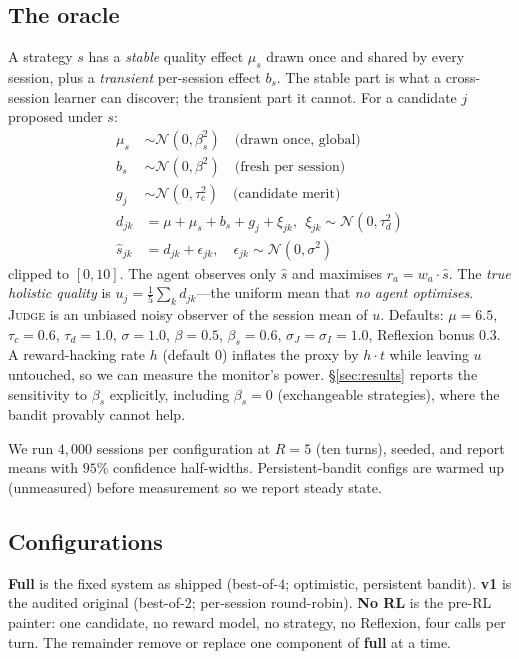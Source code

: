 \documentclass[11pt]{article}
\newcommand{\JUDGE}{\textsc{Judge}}
\theoremstyle{plain}
\theoremstyle{definition}
\begin{document}
\subsection{The oracle}
A strategy $s$ has a \emph{stable} quality effect $\mu_s$ drawn once and shared
by every session, plus a \emph{transient} per-session effect $b_s$. The stable
part is what a cross-session learner can discover; the transient part it cannot.
For a candidate $j$ proposed under $s$:
\begin{align}
\mu_s &\sim \mathcal{N}(0,\beta_{\!s}^2) \quad \text{(drawn once, global)}\nonumber\\
b_s &\sim \mathcal{N}(0,\beta^2) \quad \text{(fresh per session)}\nonumber\\
g_j &\sim \mathcal{N}(0,\tau_c^2) \quad \text{(candidate merit)}\nonumber\\
d_{jk} &= \mu + \mu_s + b_s + g_j + \xi_{jk},\ \ \xi_{jk}\sim\mathcal{N}(0,\tau_d^2)\\
\hat{s}_{jk} &= d_{jk} + \epsilon_{jk},\quad \epsilon_{jk}\sim\mathcal{N}(0,\sigma^2)\nonumber
\end{align}
clipped to $[0,10]$. The agent observes only $\hat{s}$ and maximises
$r_a = w_a \cdot \hat{s}$. The \emph{true holistic quality} is
$u_j = \frac{1}{5}\sum_k d_{jk}$---the uniform mean that \emph{no agent
optimises}. \JUDGE{} is an unbiased noisy observer of the session mean of $u$.
Defaults: $\mu{=}6.5$, $\tau_c{=}0.6$, $\tau_d{=}1.0$, $\sigma{=}1.0$,
$\beta{=}0.5$, $\beta_{\!s}{=}0.6$, $\sigma_J{=}\sigma_I{=}1.0$, Reflexion bonus
$0.3$. A reward-hacking rate $h$ (default $0$) inflates the proxy by $h\cdot t$
while leaving $u$ untouched, so we can measure the monitor's power. \S\ref{sec:results}
reports the sensitivity to $\beta_{\!s}$ explicitly, including $\beta_{\!s}{=}0$
(exchangeable strategies), where the bandit provably cannot help.

We run $4{,}000$ sessions per configuration at $R = 5$ (ten turns), seeded, and
report means with $95\%$ confidence half-widths. Persistent-bandit configs are
warmed up (unmeasured) before measurement so we report steady state.

\subsection{Configurations}
\textbf{Full} is the fixed system as shipped (best-of-$4$; optimistic,
persistent bandit). \textbf{v1} is the audited original (best-of-$2$; per-session
round-robin). \textbf{No RL} is the pre-RL painter: one candidate, no reward
model, no strategy, no Reflexion, four calls per turn. The remainder remove or
replace one component of \textbf{full} at a time.
\end{document}
